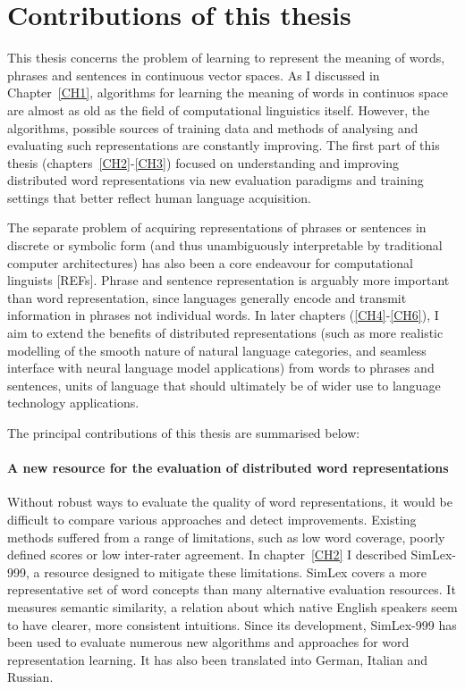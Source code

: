 
\section{Contributions of this thesis}

This thesis concerns the problem of learning to represent the meaning of words, phrases and sentences in continuous vector spaces. As I discussed in Chapter~\ref{CH1}, algorithms for learning the meaning of words in continuos space are almost as old as the field of computational linguistics itself. However, the algorithms, possible sources of training data and methods of analysing and evaluating such representations are constantly improving. The first part of this thesis (chapters~\ref{CH2}-\ref{CH3}) focused on understanding and improving distributed word representations via new evaluation paradigms and training settings that better reflect human language acquisition.

The separate problem of acquiring representations of phrases or sentences in discrete or symbolic form (and thus unambiguously interpretable by traditional computer architectures) has also been a core endeavour for computational linguists [REFs]. Phrase and sentence representation is arguably more important than word representation, since languages generally encode and transmit information in phrases not individual words. In later chapters (\ref{CH4}-\ref{CH6}), I aim to extend the benefits of distributed representations (such as more realistic modelling of the smooth nature of natural language categories, and seamless interface with neural language model applications) from words to phrases and sentences, units of language that should ultimately be of wider use to language technology applications. 

The principal contributions of this thesis are summarised below:

\paragraph{A new resource for the evaluation of distributed word representations} Without robust ways to evaluate the quality of word representations, it would be difficult to compare various approaches and detect improvements. Existing methods suffered from a range of limitations, such as low word coverage, poorly defined scores or low inter-rater agreement. In chapter~\ref{CH2} I described SimLex-999, a resource designed to mitigate these limitations. SimLex covers a more representative set of word concepts than many alternative evaluation resources. It measures semantic similarity, a relation about which native English speakers seem to have clearer, more consistent intuitions. Since its development, SimLex-999 has been used to evaluate numerous new algorithms and approaches for word representation learning. It has also been translated into German, Italian and Russian. 

